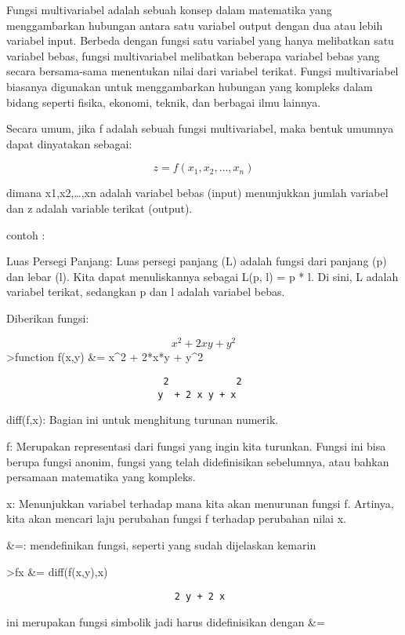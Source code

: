 \documentclass[
]{book}
\begin{document}
Fungsi multivariabel adalah sebuah konsep dalam matematika yang menggambarkan hubungan antara satu variabel output dengan dua atau lebih variabel input. Berbeda dengan fungsi satu variabel yang hanya melibatkan satu variabel bebas, fungsi multivariabel melibatkan beberapa variabel bebas yang secara bersama-sama menentukan nilai dari variabel terikat. Fungsi multivariabel biasanya digunakan untuk menggambarkan hubungan yang kompleks dalam bidang seperti fisika, ekonomi, teknik, dan berbagai ilmu lainnya.

Secara umum, jika f adalah sebuah fungsi multivariabel, maka bentuk umumnya dapat dinyatakan sebagai:

\[z=f(x_1,x_2,...,x_n)\]

dimana x1,x2,\ldots,xn adalah variabel bebas (input) menunjukkan jumlah variabel dan z adalah variable terikat (output).

contoh :

Luas Persegi Panjang: Luas persegi panjang (L) adalah fungsi dari panjang (p) dan lebar (l). Kita dapat menuliskannya sebagai L(p, l) = p * l. Di sini, L adalah variabel terikat, sedangkan p dan l adalah variabel bebas.

Diberikan fungsi:

\[x^2+2xy+y^2\]\textgreater function f(x,y) \&= x\^{}2 + 2*x*y + y\^{}2

\begin{verbatim}
                            2            2
                           y  + 2 x y + x
\end{verbatim}

diff(f,x): Bagian ini untuk menghitung turunan numerik.

f: Merupakan representasi dari fungsi yang ingin kita turunkan. Fungsi ini bisa berupa fungsi anonim, fungsi yang telah didefinisikan sebelumnya, atau bahkan persamaan matematika yang kompleks.

x: Menunjukkan variabel terhadap mana kita akan menurunan fungsi f. Artinya, kita akan mencari laju perubahan fungsi f terhadap perubahan nilai x.

\&=: mendefinikan fungsi, seperti yang sudah dijelaskan kemarin

\textgreater fx \&= diff(f(x,y),x)

\begin{verbatim}
                              2 y + 2 x
\end{verbatim}

ini merupakan fungsi simbolik jadi harus didefinisikan dengan \&=
\end{document}
